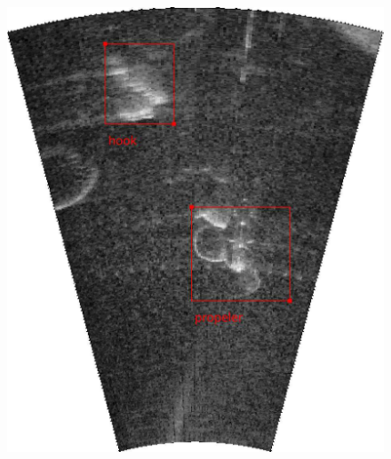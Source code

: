 \begin{figure}[t]
{        \includegraphics[height = 0.2\textheight]{chapters/images/dataset/sonar-scene-hook-propeller.jpg}    
    }
\end{figure}
